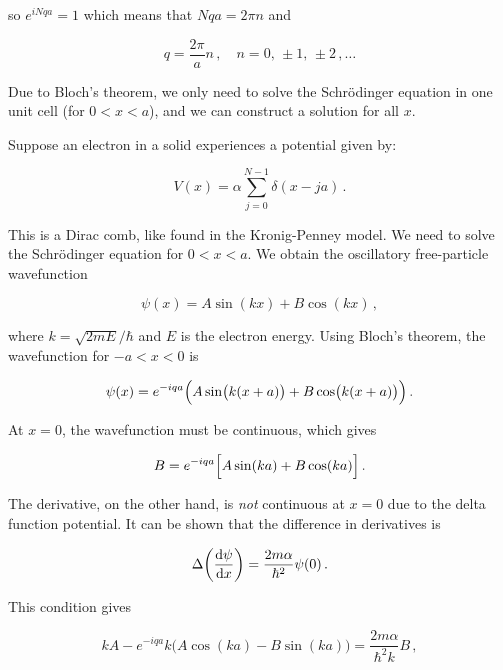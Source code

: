 \documentclass[12pt, titlepage]{article}
\begin{document}
so $e^{iNqa}=1$ which means that $Nqa = 2\pi n$ and

\begin{equation}
	q = \frac{2\pi}{a} n \,, \quad n = 0,\,\pm 1,\,\pm 2\,,\ldots
\end{equation}

Due to Bloch's theorem, we only need to solve the Schrödinger equation in one unit cell (for $0<x<a$), and we can construct a solution for all $x$.

Suppose an electron in a solid experiences a potential given by:


\begin{equation}
	V(x) = \alpha\sum_{j=0}^{N-1}\delta(x-ja) \,.
\end{equation}

This is a Dirac comb, like found in the Kronig-Penney model. We need to solve the Schrödinger equation for $0<x<a$. We obtain the oscillatory free-particle wavefunction 

\begin{equation}
	\psi(x) = A\sin(kx) + B\cos(kx) \,,
\end{equation}

where $k=\sqrt{2mE}/\hbar$ and $E$ is the electron energy. Using Bloch's theorem, the wavefunction for $-a<x<0$ is

\begin{equation}
	\psi(x) = e^{-iqa}\Bigl(A\sin\bigl(k(x+a)\bigr) + B\cos\bigl(k(x+a)\bigr)\Bigr) \,.
\end{equation}

At $x =0$, the wavefunction must be continuous, which gives

\begin{equation*}
	B = e^{-iqa}\Bigl[A\sin(ka) + B\cos(ka)\Bigr] \,.
\end{equation*}

The derivative, on the other hand, is \textit{not} continuous at $x=0$ due to the delta function potential. It can be shown that the difference in derivatives is

\begin{equation*}
	\Delta\qty(\dv{\psi}{x}) = \frac{2m\alpha}{\hbar^2}\psi(0) \,.
\end{equation*}

This condition gives

\begin{equation*}
	kA - e^{-iqa}k\biggl(A\cos(ka) - B\sin(ka)\Bigr) = \frac{2m\alpha}{\hbar^2k}B \,,
\end{equation*}
\end{document}
